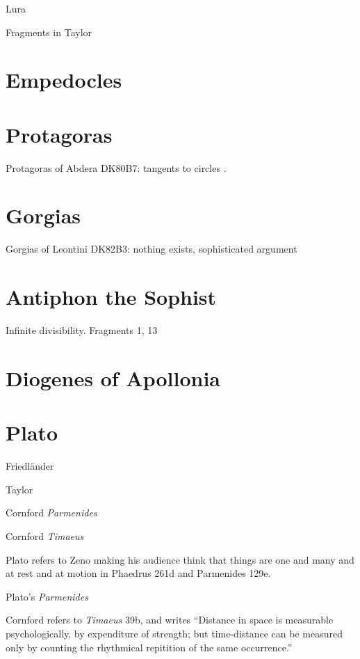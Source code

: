 \documentclass{article}
\begin{document}
Lura \cite{luria}

Fragments in Taylor \cite{taylor2010}


\section{Empedocles}



\section{Protagoras}
Protagoras of Abdera DK80B7: tangents to circles \cite[p.~126]{ancilla}.


\section{Gorgias}
Gorgias of Leontini DK82B3: nothing exists, sophisticated argument \cite[p.~128]{ancilla}


\section{Antiphon the Sophist}
Infinite divisibility. Fragments 1, 13 \cite{antiphon}


\section{Diogenes of Apollonia}




\section{Plato}
Friedl\"ander \cite{friedlander}

Taylor \cite{taylor}

Cornford {\em Parmenides} \cite{parmenides}

Cornford {\em Timaeus} \cite{timaeus}

Plato refers to Zeno making his audience think that things are one and many and at rest and at motion in Phaedrus 261d and Parmenides 129e.

Plato's {\em Parmenides} \cite[pp.~93--98, 250--260]{allen}

Cornford \cite[p.~160]{religion} refers to {\em Timaeus} 39b, and writes ``Distance in space is measurable psychologically, by expenditure of strength; but time-distance
can be measured only by counting the rhythmical repitition of the same occurrence.''
\end{document}
